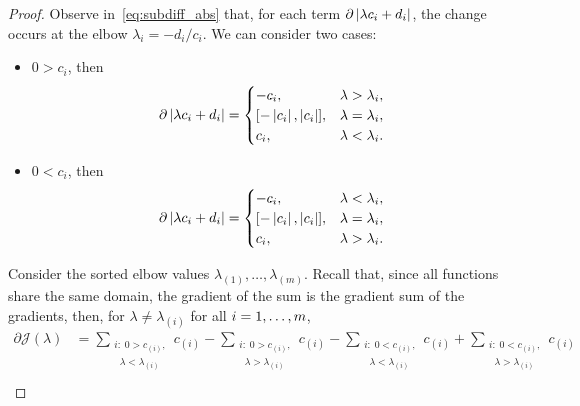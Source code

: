 \begin{proof}
    Observe in~\eqref{eq:subdiff_abs} that, for each term $\partial \left|\lambda c_i + d_i\right|$, the change occurs at the elbow $\lambda_{i} = - d_ i / c_i$. We can consider two cases:
    \begin{itemize}
        \item $0 > c_i$, then
        \begin{equation}
            \nonumber
            \begin{aligned}
                \partial \abs{\lambda c_i + d_i} = 
            \begin{cases}
                -{c_i} ,& \lambda > \lambda_i, \\
                [-\abs{c_i}, \abs{c_i}] ,& \lambda = \lambda_i, \\
                {c_i} ,& \lambda < \lambda_i .\\
            \end{cases}
            \end{aligned}
        \end{equation}
        \item $0 < c_i$, then
        \begin{equation}
            \nonumber
            \begin{aligned}
                \partial \abs{\lambda c_i + d_i} = 
            \begin{cases}
                -{c_i} ,& \lambda < \lambda_i, \\
                [-\abs{c_i}, \abs{c_i}] ,& \lambda = \lambda_i, \\
                {c_i} ,& \lambda > \lambda_i .\\
            \end{cases}
            \end{aligned}
        \end{equation}
    \end{itemize}
    Consider the sorted elbow values $\lambda_{(1)}, \ldots, \lambda_{(m)}$.
    Recall that, since all functions share the same domain, the gradient of the sum is the gradient sum of the gradients, then, for $\lambda \neq \lambda_{(i)}$ for all $i=1,\ldots,m$,
    \begin{equation}\nonumber
        \begin{aligned}
            \partial \mathcal{J}(\lambda) &=  \sum_{\substack{i:\; 0 > c_{(i)},\\ \;\; \lambda < \lambda_{(i)}}} {c_{(i)}} - \sum_{\substack{i:\; 0 > c_{(i)},\\ \;\; \lambda > \lambda_{(i)}}} {c_{(i)}}  - \sum_{\substack{i:\; 0 < c_{(i)},\\ \;\; \lambda < \lambda_{(i)}}} {c_{(i)}} + \sum_{\substack{i:\; 0 < c_{(i)},\\ \;\; \lambda > \lambda_{(i)}}} {c_{(i)}}   \\

\end{aligned}
\end{equation}
\end{proof}
